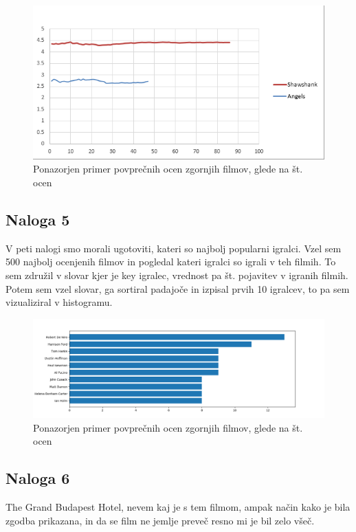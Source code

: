 \documentclass[a4paper,11pt]{article}
\begin{document}
\begin{figure}[htbp]
	\begin{center}
		\includegraphics[scale=0.9]{../slike/skupno_ocene.png}
		\caption{Ponazorjen primer povprečnih ocen zgornjih filmov, glede na št. ocen}
		\label{skupno_range}
	\end{center}
\end{figure}
\pagebreak
 
\subsection{Naloga 5}
V peti nalogi smo morali ugotoviti, kateri so najbolj popularni igralci. Vzel sem 500 najbolj ocenjenih filmov in pogledal kateri igralci so igrali v teh filmih. To sem združil v slovar kjer je key igralec, vrednost pa št. pojavitev v igranih filmih. Potem sem vzel slovar, ga sortiral padajoče in izpisal prvih 10 igralcev, to pa sem vizualiziral v histogramu. 

\begin{figure}[htbp]
	\includegraphics[scale=0.55]{../slike/pop_actors.png}
	\caption{Ponazorjen primer povprečnih ocen zgornjih filmov, glede na št. ocen}
	\label{pop_act}
\end{figure}


\subsection{Naloga 6}
The Grand Budapest Hotel, nevem kaj je s tem filmom, ampak način kako je bila zgodba prikazana, in da se film ne jemlje preveč resno mi je bil zelo všeč.
\pagebreak
\end{document}

